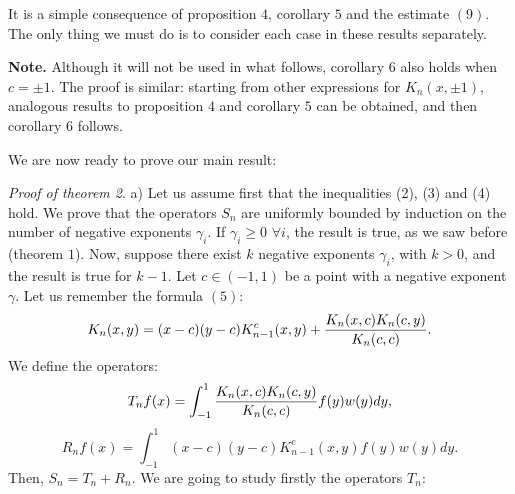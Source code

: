 \proof It is a simple consequence of proposition $4$, corollary $5$ and the
estimate $(9)$. The only thing we must do is to consider each case in these
results separately.

\medskip

{\noindent \bf Note.} Although it will not be used in what follows, corollary
$6$ also holds when $c= \pm 1$. The proof is similar: starting from other
expressions for $K_n(x,\pm 1)$, analogous results to proposition $4$ and
corollary $5$ can be obtained, and then corollary $6$ follows.

\medskip

We are now ready to prove our main result:

\medskip

{\it Proof of theorem 2}. a) Let us assume first that the inequalities (2), (3)
and (4) hold. We prove that the operators $S_n$ are uniformly bounded by
induction on the number of negative exponents $\gamma_i$. If $\gamma_i \geq 0$
$\forall i$, the result is true, as we saw before (theorem $1$). Now, suppose
there exist $k$ negative exponents $\gamma_i$, with $k>0$, and the result is
true for $k-1$. Let $c \in (-1,1)$ be a point with a negative exponent $\gamma$.
Let us remember the formula $(5)$:
$$
   K_n(x,y) = (x-c) (y-c) K_{n-1}^c(x,y) + {K_n(x,c) K_n(c,y) \over K_n(c,c)}.
$$
We define the operators:
$$
   T_nf(x) = \int_{-1}^1 {K_n(x,c) K_n(c,y) \over K_n(c,c)}f(y)w(y)dy,
$$
$$
   R_nf(x) = \int_{-1}^1 (x-c)(y-c)K_{n-1}^c(x,y)f(y)w(y)dy.
$$
Then, $S_n = T_n + R_n$. We are going to study firstly the operators $T_n$:

